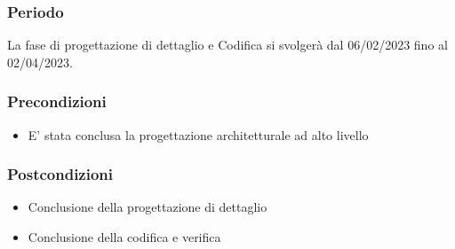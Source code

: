 \subsubsection{Periodo}
La fase di progettazione di dettaglio e Codifica si svolgerà dal 06/02/2023 fino al 02/04/2023.

\subsubsection{Precondizioni}
\begin{itemize}
    \item E’ stata conclusa la progettazione architetturale ad alto livello
\end{itemize}

\subsubsection{Postcondizioni}
\begin{itemize}
    \item Conclusione della progettazione di dettaglio
    \item Conclusione della codifica e verifica
\end{itemize}

